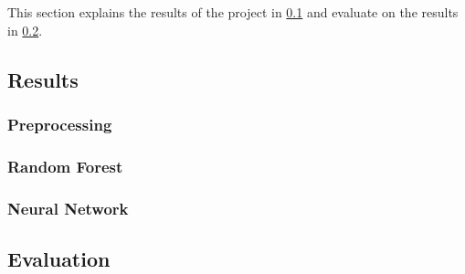 This section explains the results of the project in \ref{subsec:results} and evaluate on the results in \ref{subsec:evaluation}.

\subsection{Results}
\label{subsec:results}

\subsubsection{Preprocessing}

\subsubsection{Random Forest}

\subsubsection{Neural Network}



\subsection{Evaluation}
\label{subsec:evaluation}